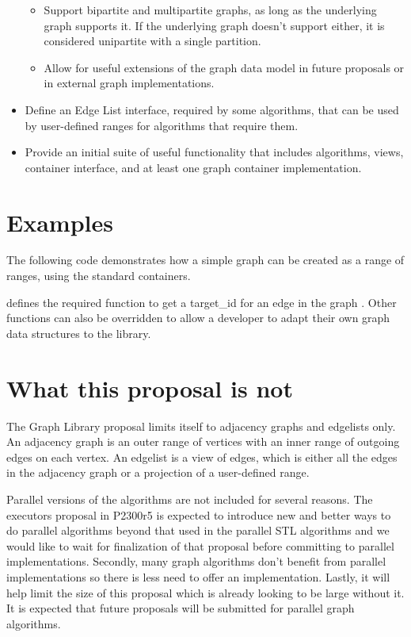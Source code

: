 \begin{itemize}
\begin{itemize}
    \item Support bipartite and multipartite graphs, as long as the underlying graph supports it. If the underlying graph doesn't support either,
          it is considered unipartite with a single partition.
    \item Allow for useful extensions of the graph data model in future proposals or in external graph implementations. 
  \end{itemize}
  \item Define an Edge List interface, required by some algorithms, that can be used by user-defined ranges for algorithms that require them.
  \item Provide an initial suite of useful functionality that includes algorithms, views, container interface, and at least one 
  graph container implementation.
\end{itemize}

\section{Examples}


The following code demonstrates how a simple graph can be created as a range of ranges, using the standard containers. 


{\small
  
}

 defines the required function to get a target\_id for an edge in the graph . Other functions can also
be overridden to allow a developer to adapt their own graph data structures to the library.

\section{What this proposal is  \textbf{not}}

The Graph Library proposal limits itself to adjacency graphs and edgelists only. An adjacency graph is an outer range of vertices with an inner range of outgoing
edges on each vertex. An edgelist is a view of edges, which is either all the edges in the adjacency graph or a projection of a user-defined range.

Parallel versions of the algorithms are not included for several reasons. The executors proposal in P2300r5 \cite{REF_P2300r5} is expected to introduce new 
and better ways to do parallel algorithms beyond that used in the parallel STL algorithms and we would like to wait for finalization of that proposal before 
committing to parallel implementations. Secondly, many graph algorithms don't benefit from parallel implementations so there is less need to offer an implementation. 
Lastly, it will help limit the size of this proposal which is already looking to be large without it. It is expected that future proposals will be submitted for parallel graph algorithms. 

